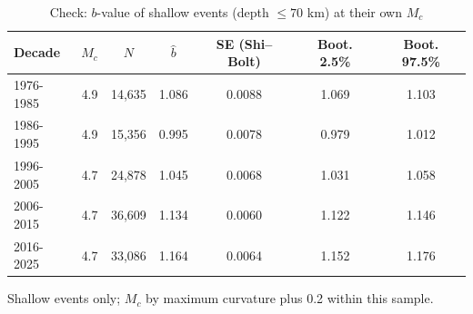 \begin{table}[t]
\centering
\begin{threeparttable}
\caption{Check: $b$-value of shallow events (depth $\leq 70$ km) at their own $M_c$}
\label{tab:check_shallow}
\begin{tabular}{lcccccc}
\toprule
Decade & $M_c$ & $N$ & $\hat b$ & SE (Shi--Bolt) & Boot. 2.5\% & Boot. 97.5\% \\
\midrule
1976-1985 & 4.9 & 14,635 & 1.086 & 0.0088 & 1.069 & 1.103 \\
1986-1995 & 4.9 & 15,356 & 0.995 & 0.0078 & 0.979 & 1.012 \\
1996-2005 & 4.7 & 24,878 & 1.045 & 0.0068 & 1.031 & 1.058 \\
2006-2015 & 4.7 & 36,609 & 1.134 & 0.0060 & 1.122 & 1.146 \\
2016-2025 & 4.7 & 33,086 & 1.164 & 0.0064 & 1.152 & 1.176 \\
\bottomrule
\end{tabular}
\begin{tablenotes}[flushleft]
\footnotesize
\item Shallow events only; $M_c$ by maximum curvature plus 0.2 within this sample.
\end{tablenotes}
\end{threeparttable}
\end{table}
